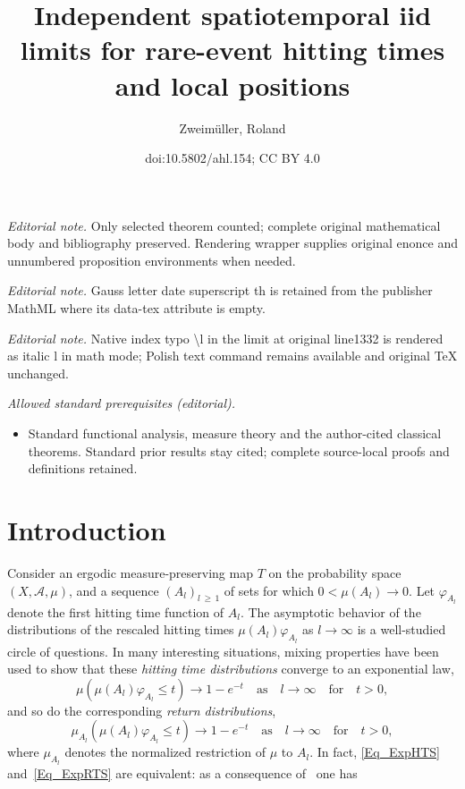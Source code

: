 \documentclass[10pt]{amsart}
\title{Independent spatiotemporal iid limits for rare-event hitting times and local positions}
\author{Zweimüller, Roland}
\date{doi:10.5802/ahl.154; CC BY 4.0}
\theoremstyle{definition}\newtheorem{defi}[theo]{Definition}\newtheorem{rema}[theo]{Remark}\newtheorem{exam}[theo]{Example}\newtheorem{exem}[theo]{Example}\newtheorem{nota}[theo]{Notation}
\newcommand{\clA}{\mathcal{A}}
\begin{document}
\maketitle
\noindent\textit{Editorial note.} Only selected theorem counted; complete original mathematical body and bibliography preserved. Rendering wrapper supplies original enonce and unnumbered proposition environments when needed.\par\medskip
\noindent\textit{Editorial note.} Gauss letter date superscript th is retained from the publisher MathML where its data-tex attribute is empty.\par\medskip
\noindent\textit{Editorial note.} Native index typo \textbackslash{}l in the limit at original line1332 is rendered as italic l in math mode; Polish text command remains available and original TeX unchanged.\par\medskip
\noindent\textit{Allowed standard prerequisites (editorial).}\begin{itemize}
\item Standard functional analysis, measure theory and the author-cited classical theorems. Standard prior results stay cited; complete source-local proofs and definitions retained.
\end{itemize}\medskip

\section{Introduction}

Consider an ergodic measure-preserving map $T$ on the probability space $(X,\clA,\mu)$, and a sequence $(A_{l})_{l\,\geq\,1}$ of sets for which $0<\mu(A_{l})\rightarrow0$. Let $\varphi_{A_{l}}$ denote the first hitting time function of $A_{l}$. The asymptotic behavior of the distributions of the rescaled hitting times $\mu(A_{l})\varphi_{A_{l}}$ as $l\rightarrow\infty$ is a well-studied circle of questions. In many interesting situations, mixing properties have been used to show that these \emph{hitting time distributions} converge to an exponential law,
\begin{equation}\label{Eq_ExpHTS}
\mu\left(\mu(A_{l})\varphi_{A_{l}}\leq t\right)\longrightarrow1-e^{-t} \quad\text{as}\quad l\rightarrow\infty\quad\text{for} \quad t>0, 
\end{equation}
and so do the corresponding \emph{return distributions},
\begin{equation}\label{Eq_ExpRTS}
\mu_{A_{l}}\left(\mu(A_{l})\varphi_{A_{l}}\leq t\right)\longrightarrow1-e^{-t}\quad \text{as}\quad l\rightarrow\infty\quad \text{for}\quad t>0, 
\end{equation}
where $\mu_{A_{l}}$ denotes the normalized restriction of $\mu$ to $A_{l}$. In fact, \eqref{Eq_ExpHTS} and~\eqref{Eq_ExpRTS} are equivalent: as a consequence of~\cite[Theorem~2.1]{HSV} one has
\end{document}
